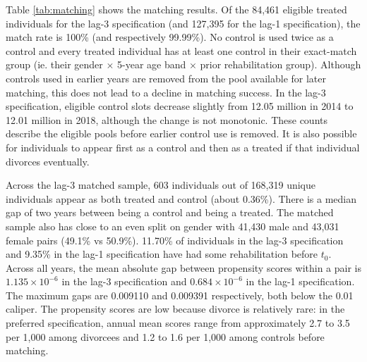 \documentclass[a4paper,12pt]{article}
\theoremstyle{plain}
\theoremstyle{definition}
\theoremstyle{TheoremNum}
\theoremstyle{CorollaryNum}
\theoremstyle{PropositionNum}
\theoremstyle{TheoremNum}
\begin{document}
\begin{table}[H]
\end{table}


Table \ref{tab:matching} shows the matching results. Of the 84,461 eligible treated individuals for the lag-3 specification (and 127,395 for the lag-1 specification), the match rate is 100\% (and respectively 99.99\%). No control is used twice as a control and every treated individual has at least one control in their exact-match group (ie. their gender $\times$ 5-year age band $\times$ prior rehabilitation group). Although controls used in earlier years are removed from the pool available for later matching, this does not lead to a decline in matching success. In the lag-3 specification, eligible control slots decrease slightly from 12.05 million in 2014 to 12.01 million in 2018, although the change is not monotonic. These counts describe the eligible pools before earlier control use is removed. It is also possible for individuals to appear first as a control and then as a treated if that individual divorces eventually. 

Across the lag-3 matched sample, 603 individuals out of 168,319 unique individuals appear as both treated and control (about 0.36\%). There is a median gap of two years between being a control and being a treated. The matched sample also has close to an even split on gender with 41,430 male and 43,031 female pairs (49.1\% vs 50.9\%). 11.70\% of individuals in the lag-3 specification and 9.35\% in the lag-1 specification have had some rehabilitation before $t_0$. Across all years, the mean absolute gap between propensity scores within a pair is $1.135 \times 10^{-6}$ in the lag-3 specification and $0.684 \times 10^{-6}$ in the lag-1 specification. The maximum gaps are 0.009110 and 0.009391 respectively, both below the 0.01 caliper. The propensity scores are low because divorce is relatively rare: in the preferred specification, annual mean scores range from approximately 2.7 to 3.5 per 1,000 among divorcees and 1.2 to 1.6 per 1,000 among controls before matching.
\end{document}
